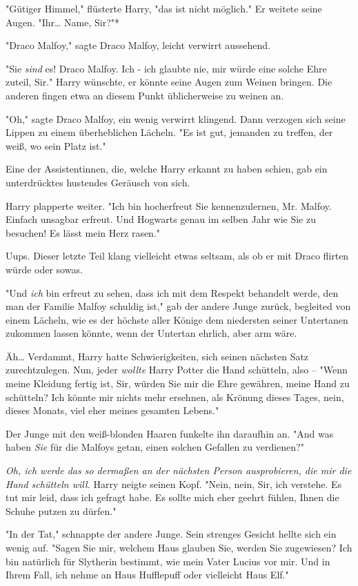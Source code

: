 {"Gütiger Himmel," flüsterte Harry, "das ist nicht möglich." Er weitete seine Augen. "Ihr… Name, Sir?"*

"Draco Malfoy," sagte Draco Malfoy, leicht verwirrt aussehend.

"Sie \emph{sind} es! Draco Malfoy. Ich - ich glaubte nie, mir würde eine solche Ehre zuteil, Sir." Harry wünschte, er könnte seine Augen zum Weinen bringen. Die anderen fingen etwa an diesem Punkt üblicherweise zu weinen an.

"Oh," sagte Draco Malfoy, ein wenig verwirrt klingend. Dann verzogen sich seine Lippen zu einem überheblichen Lächeln. "Es ist gut, jemanden zu treffen, der weiß, wo sein Platz ist."

Eine der Assistentinnen, die, welche Harry erkannt zu haben schien, gab ein unterdrücktes hustendes Geräusch von sich.

Harry plapperte weiter. "Ich bin hocherfreut Sie kennenzulernen, Mr. Malfoy. Einfach unsagbar erfreut. Und Hogwarts genau im selben Jahr wie Sie zu besuchen! Es lässt mein Herz rasen."

Uups. Dieser letzte Teil klang vielleicht etwas seltsam, als ob er mit Draco flirten würde oder sowas.

"Und \emph{ich} bin erfreut zu sehen, dass ich mit dem Respekt behandelt werde, den man der Familie Malfoy schuldig ist," gab der andere Junge zurück, begleited von einem Lächeln, wie es der höchste aller Könige dem niedersten seiner Untertanen zukommen lassen könnte, wenn der Untertan ehrlich, aber arm wäre.

Äh… Verdammt, Harry hatte Schwierigkeiten, sich seinen nächsten Satz zurechtzulegen. Nun, jeder \emph{wollte} Harry Potter die Hand schütteln, also -- "Wenn meine Kleidung fertig ist, Sir, würden Sie mir die Ehre gewähren, meine Hand zu schütteln? Ich könnte mir nichts mehr ersehnen, als Krönung dieses Tages, nein, dieses Monats, viel eher meines gesamten Lebens."

Der Junge mit den weiß-blonden Haaren funkelte ihn daraufhin an. "And was haben \emph{Sie} für die Malfoys getan, einen solchen Gefallen zu verdienen?"

\emph{Oh, ich werde das so dermaßen an der nächsten Person ausprobieren, die mir die Hand schütteln will.} Harry neigte seinen Kopf. "Nein, nein, Sir, ich verstehe. Es tut mir leid, dass ich gefragt habe. Es sollte mich eher geehrt fühlen, Ihnen die Schuhe putzen zu dürfen."

"In der Tat," schnappte der andere Junge. Sein strenges Gesicht hellte sich ein wenig auf. "Sagen Sie mir, welchem Haus glauben Sie, werden Sie zugewiesen? Ich bin natürlich für Slytherin bestimmt, wie mein Vater Lucius vor mir. Und in Ihrem Fall, ich nehme an Haus Hufflepuff oder vielleicht Haus Elf."

}
